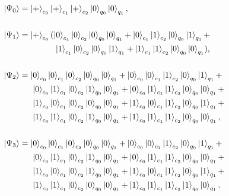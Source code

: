 \begin{align}
    \ket{\Psi_0} &= \ket{+}_{c_0}\ket{+}_{c_1}\ket{+}_{c_2}\ket{0}_{q_0}\ket{0}_{q_1}, \nonumber \\ \nonumber \\
    \ket{\Psi_1} &= \ket{+}_{c_0}(\ket{0}_{c_1}\ket{0}_{c_2}\ket{0}_{q_0}\ket{0}_{q_1} + \ket{0}_{c_1}\ket{1}_{c_2}\ket{0}_{q_0}\ket{1}_{q_1} + \nonumber \\ 
                 &\>\qquad\qquad \ket{1}_{c_1}\ket{0}_{c_2}\ket{0}_{q_0}\ket{1}_{q_1} + \ket{1}_{c_1}\ket{1}_{c_2}\ket{0}_{q_0}\ket{0}_{q_1}), \nonumber \\ \nonumber \\
    \ket{\Psi_2} &= \ket{0}_{c_0}\ket{0}_{c_1}\ket{0}_{c_2}\ket{0}_{q_0}\ket{0}_{q_1} + \ket{0}_{c_0}\ket{0}_{c_1}\ket{1}_{c_2}\ket{0}_{q_0}\ket{1}_{q_1} + \nonumber \\
                 &\>\>\quad \ket{0}_{c_0}\ket{1}_{c_1}\ket{0}_{c_2}\ket{1}_{q_0}\ket{0}_{q_1} + \ket{0}_{c_0}\ket{1}_{c_1}\ket{1}_{c_2}\ket{0}_{q_0}\ket{0}_{q_1} + \nonumber \\
                 &\>\>\quad \ket{1}_{c_0}\ket{0}_{c_1}\ket{0}_{c_2}\ket{0}_{q_0}\ket{0}_{q_1} + \ket{1}_{c_0}\ket{0}_{c_1}\ket{1}_{c_2}\ket{0}_{q_0}\ket{1}_{q_1} + \nonumber \\
                 &\>\>\quad \ket{1}_{c_0}\ket{1}_{c_1}\ket{0}_{c_2}\ket{1}_{q_0}\ket{0}_{q_1} + \ket{1}_{c_0}\ket{1}_{c_1}\ket{1}_{c_2}\ket{0}_{q_0}\ket{0}_{q_1}, \nonumber \\ \nonumber \\
    \ket{\Psi_3} &= \ket{0}_{c_0}\ket{0}_{c_1}\ket{0}_{c_2}\ket{0}_{q_0}\ket{0}_{q_1} + \ket{0}_{c_0}\ket{0}_{c_1}\ket{1}_{c_2}\ket{0}_{q_0}\ket{1}_{q_1} + \nonumber \\
                 &\>\>\quad\ket{0}_{c_0} \ket{1}_{c_1}\ket{0}_{c_2}\ket{1}_{q_0}\ket{0}_{q_1} + \ket{0}_{c_0}\ket{1}_{c_1}\ket{1}_{c_2}\ket{0}_{q_0}\ket{0}_{q_1} + \nonumber \\
                 &\>\>\quad\ket{1}_{c_0}\ket{0}_{c_1}\ket{0}_{c_2}\ket{1}_{q_0}\ket{0}_{q_1} + \ket{1}_{c_0}\ket{0}_{c_1}\ket{1}_{c_2}\ket{0}_{q_0}\ket{1}_{q_1} + \nonumber \\ 
                 &\>\>\quad\ket{1}_{c_0}\ket{1}_{c_1}\ket{0}_{c_2}\ket{0}_{q_0}\ket{0}_{q_1} + \ket{1}_{c_0}\ket{1}_{c_1}\ket{1}_{c_2}\ket{1}_{q_0}\ket{0}_{q_1}.
\end{align}


